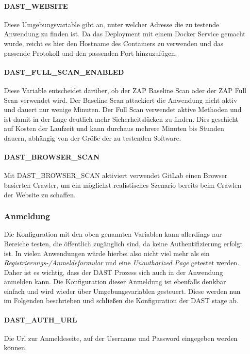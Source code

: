 \paragraph{DAST\_WEBSITE} Diese Umgebungsvariable gibt an, unter welcher Adresse die zu testende Anwendung zu finden ist.
Da das Deployment mit einem Docker Service gemacht wurde, reicht es hier den Hostname des Containers zu verwenden und das passende Protokoll und den passenden Port hinzuzufügen.
\paragraph{DAST\_FULL\_SCAN\_ENABLED} Diese Variable entscheidet darüber, ob der ZAP Baseline Scan\cite{OWASPZAPBaseline} oder der ZAP Full Scan\cite{OWASPZAPFull} verwendet wird.
Der Baseline Scan attackiert die Anwendung nicht aktiv und dauert nur wenige Minuten.
Der Full Scan verwendet aktive Methoden und ist damit in der Lage deutlich mehr Sicherheitslücken zu finden.
Dies geschieht auf Kosten der Laufzeit und kann durchaus mehrere Minuten bis Stunden dauern, abhängig von der Größe der zu testenden Software.
\paragraph{DAST\_BROWSER\_SCAN} Mit DAST\_BROWSER\_SCAN aktiviert verwendet GitLab einen Browser basierten Crawler, um ein möglichst realistisches Szenario bereits beim Crawlen der Website zu schaffen.

\subsubsection{Anmeldung}

Die Konfiguration mit den oben genannten Variablen kann allerdings nur Bereiche testen, die öffentlich zugänglich sind, da keine Authentifizierung erfolgt ist.
In vielen Anwendungen würde hierbei also nicht viel mehr als ein \textit{Registrierungs-/Anmeldeformular} und eine \textit{Unauthorized Page} getestet werden.
Daher ist es wichtig, dass der DAST Prozess sich auch in der Anwendung anmelden kann.
Die Konfiguration dieser Anmeldung ist ebenfalls denkbar einfach und wird wieder über Umgebungsvariablen gesteuert.
Diese werden nun im Folgenden beschrieben und schließen die Konfiguration der DAST stage ab.

\paragraph{DAST\_AUTH\_URL}
Die Url zur Anmeldeseite, auf der Username und Password eingegeben werden können.

